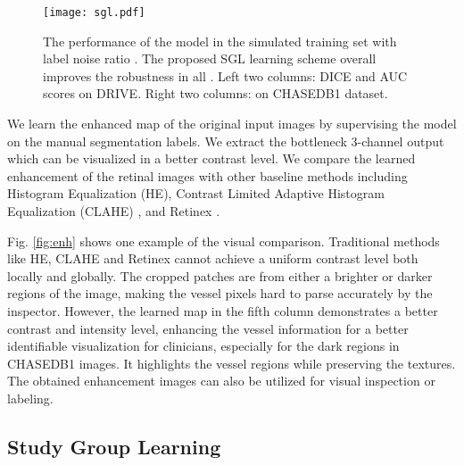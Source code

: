 \documentclass[runningheads]{llncs}
\begin{document}
\begin{figure}[t]\setlength{\abovecaptionskip}{0pt}
\centering
\texttt{[image: sgl.pdf]}
\caption{The performance of the model in the simulated training set with label noise ratio . The proposed SGL learning scheme overall improves the robustness in all . Left two columns: DICE and AUC scores on DRIVE. Right two columns: on CHASEDB1 dataset.}
\label{fig:drive}
\end{figure}
We learn the enhanced map of the original input images by supervising the model on the manual segmentation labels. We extract the bottleneck 3-channel output which can be visualized in a better contrast level. We compare the learned enhancement of the retinal images with other baseline methods including Histogram Equalization (HE), Contrast Limited Adaptive Histogram Equalization (CLAHE) \cite{pizer1987adaptive}, and Retinex \cite{zhao2015retinal}. 

Fig. \ref{fig:enh} shows one example of the visual comparison. Traditional methods like HE, CLAHE and Retinex cannot achieve a uniform contrast level both locally and globally. The cropped patches are from either a brighter or darker regions of the image, making the vessel pixels hard to parse accurately by the inspector. However, the learned map in the fifth column demonstrates a better contrast and intensity level, enhancing the vessel information for a better identifiable visualization for clinicians, especially for the dark regions in CHASEDB1 images. It highlights the vessel regions while preserving the textures. The obtained enhancement images can also be utilized for visual inspection or labeling.
\subsection{Study Group Learning}
\end{document}
